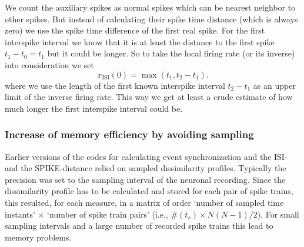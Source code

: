 \documentclass[10pt,twocolumn]{elsart5p}
\begin{document}
We count the auxiliary spikes as normal spikes which can be nearest neighbor to other spikes. But instead of calculating their spike time distance (which is always zero) we use the spike time difference of the first real spike. For the first interspike interval we know that it is at least the distance to the first spike $t_1-t_0 = t_1$ but it could be longer. So to take the local firing rate (or its inverse) into consideration we set
%
\begin{equation} \label{eq:Corrected-First-ISI}
    x_{\mathrm {ISI}} (0) = \max ( t_1, t_2 - t_1 ).
\end{equation}
%
where we use the length of the first known interspike interval $t_2-t_1$ as an upper limit of the inverse firing rate. This way we get at least a crude estimate of how much longer the first interspike interval could be.


\subsubsection{\label{sss:Sampling} Increase of memory efficiency by avoiding sampling}

Earlier versions of the codes for calculating event synchronization and the ISI- and the SPIKE-distance relied on sampled dissimilarity profiles. Typically the precision was set to the sampling interval of the neuronal recording. Since the dissimilarity profile has to be calculated and stored for each pair of spike trains, this resulted, for each measure, in a matrix of order `number of sampled time instants' $\times$ `number of spike train pairs' (i.e., $\# (t_s) \times N(N-1)/2$). For small sampling intervals and a large number of recorded spike trains this lead to memory problems.
\end{document}
